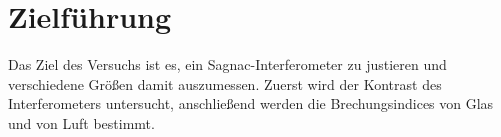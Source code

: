 \section{Zielführung}
Das Ziel des Versuchs ist es, ein Sagnac-Interferometer zu justieren und verschiedene Größen damit auszumessen.
Zuerst wird der Kontrast des Interferometers untersucht, anschließend werden die Brechungsindices von Glas und von Luft bestimmt.
